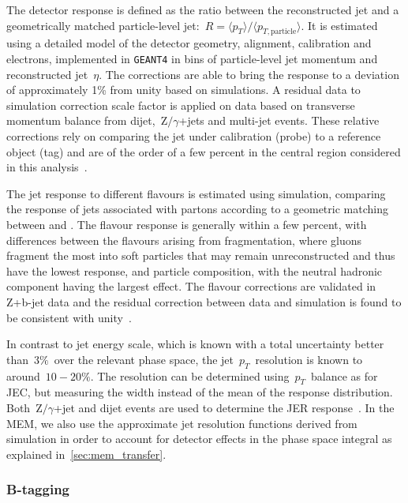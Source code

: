 The detector response is defined as the ratio between the reconstructed jet and a geometrically matched particle-level jet:~$R = \langle p_T \rangle / \langle p_{T,\mathrm{particle}} \rangle$. It is estimated using a detailed model of the detector geometry, alignment, calibration and electrons, implemented in \texttt{GEANT4} in bins of particle-level jet momentum and reconstructed jet~$\eta$. The corrections are able to bring the response to a deviation of approximately 1\% from unity based on simulations. A residual data to simulation correction scale factor is applied on data based on transverse momentum balance from dijet,~$\mathrm{Z}/\gamma$+jets and multi-jet events. These relative corrections rely on comparing the jet under calibration (probe) to a reference object (tag) and are of the order of a few percent in the central region considered in this analysis~\cite{Chatrchyan:2011ds,cms_jec_2017}.

The jet response to different flavours is estimated using simulation, comparing the response of jets associated with partons according to a geometric matching between \pythia and \herwig. The flavour response is generally within a few percent, with differences between the flavours arising from fragmentation, where gluons fragment the most into soft particles that may remain unreconstructed and thus have the lowest response, and particle composition, with the neutral hadronic component having the largest effect. The flavour corrections are validated in Z+b-jet data and the residual correction between data and simulation is found to be consistent with unity~\cite{Chatrchyan:2011ds}.

In contrast to jet energy scale, which is known with a total uncertainty better than~$3\%$~over the relevant phase space, the jet~$p_T$~resolution is known to around~$10-20\%$. The resolution can be determined using~$p_T$~balance as for JEC, but measuring the width instead of the mean of the response distribution. Both~$\mathrm{Z}/\gamma$+jet and dijet events are used to determine the JER response~\cite{Chatrchyan:2011ds}. In the MEM, we also use the approximate jet resolution functions derived from simulation in order to account for detector effects in the phase space integral as explained in~\cref{sec:mem_transfer}.

\subsubsection{B-tagging}
\label{sec:object_id_btag}

